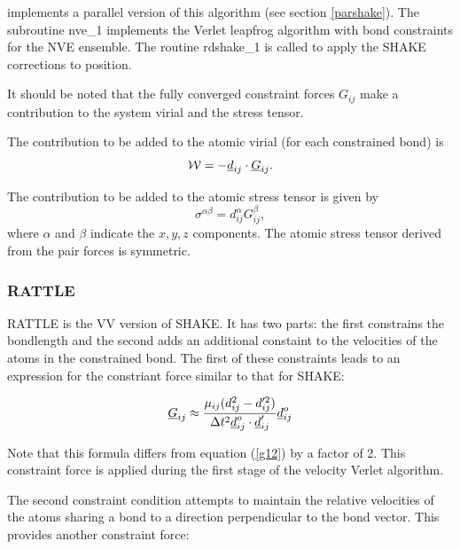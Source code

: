 \D{} implements a parallel version of this algorithm
\cite{smith-94b} (see section \ref{parshake}).  The
subroutine {\sc nve\_1} implements the Verlet
leapfrog algorithm with bond constraints for
the NVE ensemble. The routine {\sc rdshake\_1} is called to apply the
SHAKE corrections to position.

It should be noted that the fully converged constraint forces
$G_{ij}$ make a contribution to the system virial and the stress
tensor.

The contribution to be added to the atomic virial (for each constrained
bond) is
\begin{equation}
{\cal W}=-\mbox{$\underline{d}$}_{ij}\cdot\mbox{$\underline{G}$}_{ij}.
\end{equation}

The contribution to be added to the atomic stress tensor
 is given by
\begin{equation}
\sigma^{\alpha \beta}=d_{ij}^{\alpha}G_{ij}^{\beta},
\end{equation}
where $\alpha$ and $\beta$ indicate the $x,y,z$ components. The atomic
stress tensor derived from the pair forces is symmetric.

\subsubsection{RATTLE}
\label{rattle}

RATTLE \cite{andersen-83a} is the VV version
of SHAKE. It has two parts: the first constrains the bondlength and
the second adds an additional constaint to the velocities of the atoms
in the constrained bond. The first of these constraints leads to an
expression for the constriant force similar to that for SHAKE:

\begin{equation}
\mbox{$\underline{G}$}_{ij}\approx\frac{\mu_{ij}(d_{ij}^{2}-d_{ij}'^{2})}
{\Delta t^{2}\mbox{$\underline{d}$}_{ij}^{o}\cdot\mbox{$\underline{d}$}_{ij}'}\mbox{$\underline{d}$}_{ij}^{o} \label{gg12}
\end{equation}

Note that this formula differs from  equation (\ref{g12}) by a factor
of 2. This constraint force is applied during the first stage of the velocity
Verlet algorithm.

The second constraint condition attempts to maintain the relative
velocities of the atoms sharing a bond to a direction perpendicular to
the bond vector. This provides another constraint force:

